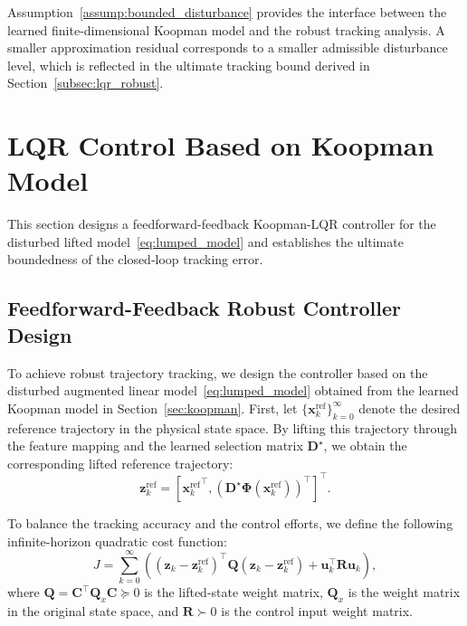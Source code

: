 \documentclass[letterpaper,10pt,conference]{ieeeconf}
\newcommand{\x}{\mathbf{x}}
\newcommand{\uvec}{\mathbf{u}}
\newcommand{\z}{\mathbf{z}}
\newcommand{\Dmat}{\mathbf{D}}
\newcommand{\C}{\mathbf{C}}
\newcommand{\Q}{\mathbf{Q}}
\newcommand{\Rmat}{\mathbf{R}}
\newcommand{\Phib}{\boldsymbol{\Phi}}
\begin{document}
Assumption~\ref{assump:bounded_disturbance} provides the interface between the learned finite-dimensional Koopman model and the robust tracking analysis. A smaller approximation residual corresponds to a smaller admissible disturbance level, which is reflected in the ultimate tracking bound derived in Section~\ref{subsec:lqr_robust}.


\section{LQR Control Based on Koopman Model}
\label{sec:lqr}

This section designs a feedforward-feedback Koopman-LQR controller for the disturbed lifted model~\eqref{eq:lumped_model} and establishes the ultimate boundedness of the closed-loop tracking error.

\subsection{Feedforward-Feedback Robust Controller Design}
\label{subsec:lqr_design}

To achieve robust trajectory tracking, we design the controller based on the disturbed augmented linear model~\eqref{eq:lumped_model} obtained from the learned Koopman model in Section~\ref{sec:koopman}.
First, let $\{\x_k^{\text{ref}}\}_{k=0}^{\infty}$ denote the desired reference trajectory in the physical state space. By lifting this trajectory through the feature mapping and the learned selection matrix $\Dmat^\star$, we obtain the corresponding lifted reference trajectory: 
\begin{equation}
\z_k^{\text{ref}} = [{\x_k^{\text{ref}}}^\top, {(\Dmat^\star\Phib(\x_k^{\text{ref}}))}^\top]^\top.
\end{equation}

To balance the tracking accuracy and the control efforts, we define the following infinite-horizon quadratic cost function:
\begin{equation}
\label{eq:lqr_cost}
J = \sum_{k=0}^{\infty} \left( (\z_k - \z_k^{\text{ref}})^\top \Q (\z_k - \z_k^{\text{ref}}) + \uvec_k^\top \Rmat \uvec_k \right),
\end{equation}
where $\Q = \C^\top \Q_x \C \succeq 0$ is the lifted-state weight matrix, $\Q_x$ is the weight matrix in the original state space, and $\Rmat \succ 0$ is the control input weight matrix.
\end{document}
